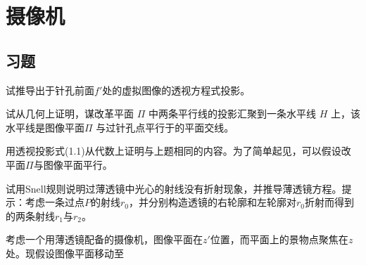 
\section{摄像机}

\subsection{习题}

\begin{problem}
    试推导出于针孔前面$f'$处的虚拟图像的透视方程式投影。
\end{problem}

\begin{problem}
    试从几何上证明，谋改革平面 $\Pi$ 中两条平行线的投影汇聚到一条水平线 $H$ 上，该水平线是图像平面$\Pi$ 与过针孔点平行于的平面交线。
\end{problem}

\begin{problem}
    用透视投影式(1.1)从代数上证明与上题相同的内容。为了简单起见，可以假设改平面$\Pi$与图像平面平行。
\end{problem}

\begin{problem}
    试用Snell规则说明过薄透镜中光心的射线没有折射现象，并推导薄透镜方程。提示：考虑一条过点$P$的射线$r_0$，并分别构造透镜的右轮廓和左轮廓对$r_0$折射而得到的两条射线$r_1$与$r_2$。
\end{problem}

\begin{problem}
    考虑一个用薄透镜配备的摄像机，图像平面在$z'$位置，而平面上的景物点聚焦在$z$处。现假设图像平面移动至
\end{problem}